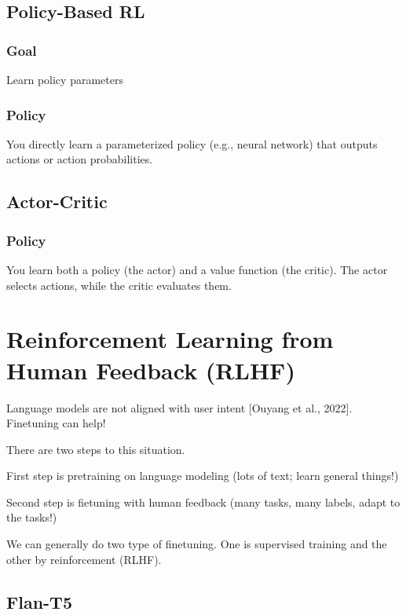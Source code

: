 \documentclass{article}
\begin{document}
\subsection{Policy-Based RL}

\subsubsection{Goal} Learn policy parameters

\subsubsection{Policy} You directly learn a parameterized policy (e.g., neural network) that outputs actions or action probabilities.

\subsection{Actor-Critic}

\subsubsection{Policy} You learn both a policy (the actor) and a value function (the critic). The actor selects actions, while the critic evaluates them.

\clearpage\newpage

\section{Reinforcement Learning from Human Feedback (RLHF)}

Language models are not aligned with user intent [Ouyang et al., 2022]. Finetuning can help!

There are two steps to this situation.

First step is pretraining on language modeling (lots of text; learn general things!)

Second step is fietuning with human feedback (many tasks, many labels, adapt to the tasks!)

We can generally do two type of finetuning. One is supervised training and the other by reinforcement (RLHF).

\subsection{Flan-T5}
\end{document}
